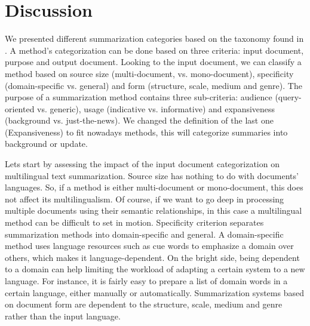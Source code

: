 \section{Discussion}

We presented different summarization categories based on the taxonomy found in \citep{98-hovy-lin,99-sparckjones}. 
A method's categorization can be done based on three criteria: input document, purpose and output document. 
Looking to the input document, we can classify a method based on source size (multi-document, vs. mono-document), specificity (domain-specific vs. general) and form (structure, scale, medium and genre). 
The purpose of a summarization method contains three sub-criteria: audience (query-oriented vs. generic), usage (indicative vs. informative) and expansiveness (background vs. just-the-news).
We changed the definition of the last one (Expansiveness) to fit nowadays methods, this will categorize summaries into background or update.


Lets start by assessing the impact of the input document categorization on multilingual text summarization. 
Source size has nothing to do with documents' languages. 
So, if a method is either multi-document or mono-document, this does not affect its multilingualism. 
Of course, if we want to go deep in processing multiple documents using their semantic relationships, in this case a multilingual method can be difficult to set in motion. 
Specificity criterion separates summarization methods into domain-specific and general. 
A domain-specific method uses language resources such as cue words to emphasize a domain over others, which makes it language-dependent. 
On the bright side, being dependent to a domain can help limiting the workload of adapting a certain system to a new language. 
For instance, it is fairly easy to prepare a list of domain words in a certain language, either manually or automatically. 
Summarization systems based on document form are dependent to the structure, scale, medium and genre rather than the input language. 

